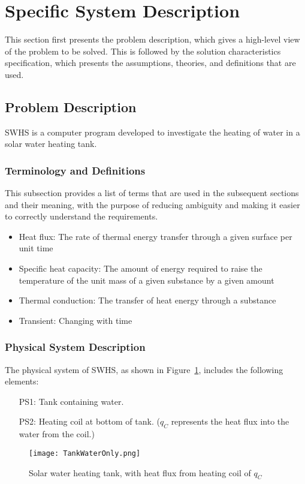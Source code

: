 \documentclass[12pt]{article}
\begin{document}
\section{Specific System Description}
\label{Sec:SpecSystDesc}
This section first presents the problem description, which gives a high-level view of the problem to be solved. This is followed by the solution characteristics specification, which presents the assumptions, theories, and definitions that are used.
\subsection{Problem Description}
\label{Sec:ProbDesc}
SWHS is a computer program developed to investigate the heating of water in a solar water heating tank.
\subsubsection{Terminology and Definitions}
\label{Sec:TermDefs}
This subsection provides a list of terms that are used in the subsequent sections and their meaning, with the purpose of reducing ambiguity and making it easier to correctly understand the requirements.
\begin{itemize}
\item{Heat flux: The rate of thermal energy transfer through a given surface per unit time}
\item{Specific heat capacity: The amount of energy required to raise the temperature of the unit mass of a given substance by a given amount}
\item{Thermal conduction: The transfer of heat energy through a substance}
\item{Transient: Changing with time}
\end{itemize}
\subsubsection{Physical System Description}
\label{Sec:PhysSyst}
The physical system of SWHS, as shown in Figure~\ref{Figure:Tank}, includes the following elements:
\begin{itemize}
\item[PS1:]Tank containing water.
\item[PS2:]Heating coil at bottom of tank. (${q_{C}}$ represents the heat flux into the water from the coil.)
\end{itemize}
\begin{figure}
\begin{center}
\texttt{[image: TankWaterOnly.png]}
\caption{Solar water heating tank, with heat flux from heating coil of ${q_{C}}$}
\label{Figure:Tank}
\end{center}
\end{figure}
\end{document}
